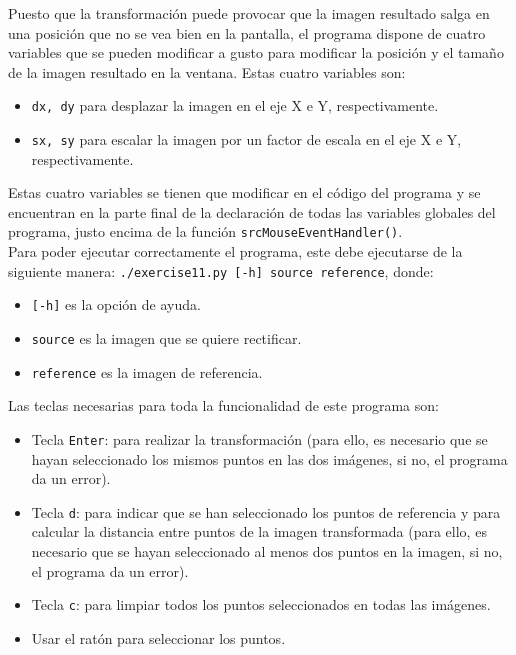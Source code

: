 \documentclass[a4paper,10pt,titlepage,oneside,openright]{book}
\begin{document}
Puesto que la transformación puede provocar que la imagen resultado salga en una posición que no se vea bien en la pantalla, el programa dispone de cuatro variables que se pueden modificar a gusto para modificar la posición y el tamaño de la imagen resultado en la ventana. Estas cuatro variables son:
\begin{itemize}
 \item \texttt{dx, dy} para desplazar la imagen en el eje X e Y, respectivamente.
 \item \texttt{sx, sy} para escalar la imagen por un factor de escala en el eje X e Y, respectivamente.
\end{itemize}
Estas cuatro variables se tienen que modificar en el código del programa y se encuentran en la parte final de la declaración de todas las variables globales del programa, justo encima de la función \texttt{srcMouseEventHandler()}. \\

Para poder ejecutar correctamente el programa, este debe ejecutarse de la siguiente manera: \texttt{./exercise11.py [-h] source reference}, donde:
\begin{itemize}
 \item \texttt{[-h]} es la opción de ayuda.
 \item \texttt{source} es la imagen que se quiere rectificar.
 \item \texttt{reference} es la imagen de referencia.
\end{itemize}

Las teclas necesarias para toda la funcionalidad de este programa son:
\begin{itemize}
 \item Tecla \texttt{Enter}: para realizar la transformación (para ello, es necesario que se hayan seleccionado los mismos puntos en las dos imágenes, si no, el programa da un error).
 \item Tecla \texttt{d}: para indicar que se han seleccionado los puntos de referencia y para calcular la distancia entre puntos de la imagen transformada (para ello, es necesario que se hayan seleccionado al menos dos puntos en la imagen, si no, el programa da un error).
 \item Tecla \texttt{c}: para limpiar todos los puntos seleccionados en todas las imágenes.
 \item Usar el ratón para seleccionar los puntos.
\end{itemize}




\medskip
\end{document}
